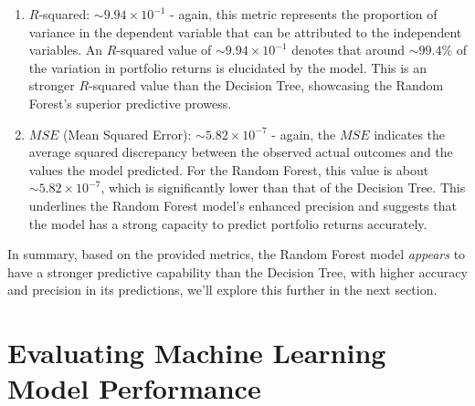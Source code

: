 \documentclass[a4paper,12pt,titlepage]{article}
\numberwithin{equation}{section}
\begin{document}
\begin{tcolorbox}[colback=red!5, colframe=red!75!black, title=\textbf{Random Forest Model Analysis}]
\begin{enumerate}
	\item $R$-squared: $\sim 9.94 \times 10^{-1}$ - again, this metric represents the proportion of variance in 
		the dependent variable that can be attributed to the independent variables. An $R$-squared value of 
		$\sim 9.94 \times 10^{-1}$ denotes that around $\sim 99.4\%$ of the variation in portfolio returns is elucidated 
		by the model. This is an stronger $R$-squared value than the Decision Tree, showcasing the Random 
		Forest's superior predictive prowess.
	
	\item $MSE$ (Mean Squared Error): $\sim 5.82 \times 10^{-7}$ - again, the $MSE$ indicates the average squared discrepancy 
		between the observed actual outcomes and the values the model predicted. For the Random Forest, this value 
		is about $\sim 5.82 \times 10^{-7}$, which is significantly lower than that of the Decision Tree. This 
		underlines the Random Forest model's enhanced precision and suggests that the model has a strong capacity 
		to predict portfolio returns accurately.

\end{enumerate}

In summary, based on the provided metrics, the Random Forest model \textit{appears} to have a stronger predictive 
capability than the Decision Tree, with higher accuracy and precision in its predictions, we'll explore this further in the
next section.

\end{tcolorbox}

\section{Evaluating Machine Learning Model Performance}
\end{document}
